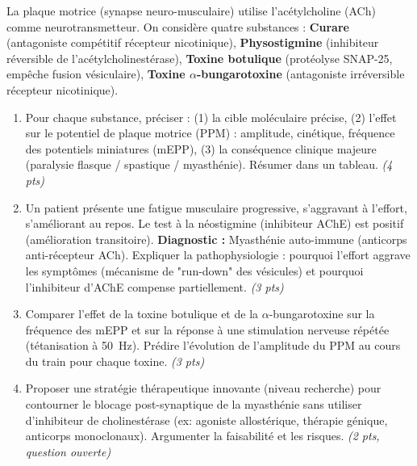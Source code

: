 \documentclass[11pt]{article}
\begin{document}
\begin{exercice}
La plaque motrice (synapse neuro-musculaire) utilise l'acétylcholine (ACh) comme neurotransmetteur. On considère quatre substances : \textbf{Curare} (antagoniste compétitif récepteur nicotinique), \textbf{Physostigmine} (inhibiteur réversible de l'acétylcholinestérase), \textbf{Toxine botulique} (protéolyse SNAP-25, empêche fusion vésiculaire), \textbf{Toxine $\alpha$-bungarotoxine} (antagoniste irréversible récepteur nicotinique).
\begin{enumerate}
\item Pour chaque substance, préciser : (1) la cible moléculaire précise, (2) l'effet sur le potentiel de plaque motrice (PPM) : amplitude, cinétique, fréquence des potentiels miniatures (mEPP), (3) la conséquence clinique majeure (paralysie flasque / spastique / myasthénie). Résumer dans un tableau. \textit{(4 pts)}
\item Un patient présente une fatigue musculaire progressive, s'aggravant à l'effort, s'améliorant au repos. Le test à la néostigmine (inhibiteur AChE) est positif (amélioration transitoire). \textbf{Diagnostic :} Myasthénie auto-immune (anticorps anti-récepteur ACh). Expliquer la pathophysiologie : pourquoi l'effort aggrave les symptômes (mécanisme de "run-down" des vésicules) et pourquoi l'inhibiteur d'AChE compense partiellement. \textit{(3 pts)}
\item Comparer l'effet de la toxine botulique et de la $\alpha$-bungarotoxine sur la fréquence des mEPP et sur la réponse à une stimulation nerveuse répétée (tétanisation à \SI{50}{\hertz}). Prédire l'évolution de l'amplitude du PPM au cours du train pour chaque toxine. \textit{(3 pts)}
\item Proposer une stratégie thérapeutique innovante (niveau recherche) pour contourner le blocage post-synaptique de la myasthénie sans utiliser d'inhibiteur de cholinestérase (ex: agoniste allostérique, thérapie génique, anticorps monoclonaux). Argumenter la faisabilité et les risques. \textit{(2 pts, question ouverte)}
\end{enumerate}
\end{exercice}
\end{document}
